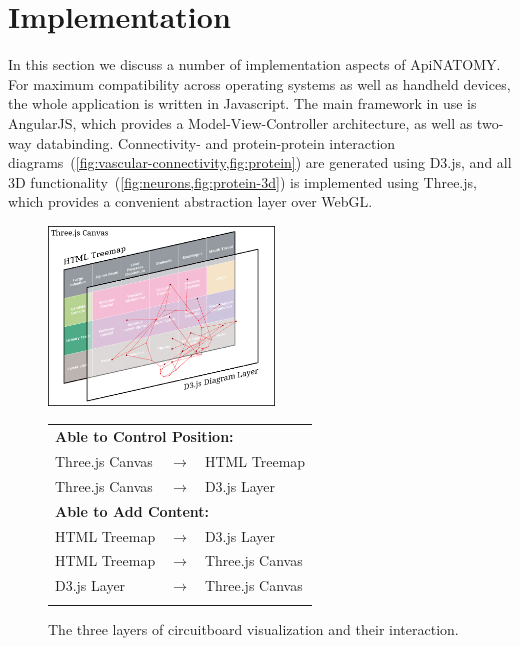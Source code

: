 \section{Implementation} \label{sect:implementation}                                     %

In this section we discuss a number of implementation aspects of \mbox{ApiNATOMY}.
For maximum compatibility across operating systems as well as handheld devices,
the whole application is written in Javascript. The main framework in use is
AngularJS, which provides a Model-View-Controller architecture, as well as
two-way databinding. Connectivity- and protein-protein
interaction diagrams~(\cref{fig:vascular-connectivity,fig:protein})
are generated using D3.js, and all 3D functionality~(\cref{fig:neurons,fig:protein-3d})
is implemented using Three.js, which provides a convenient abstraction layer over WebGL.

\begin{figure}[ht]
	\centering
	\includegraphics[width=6cm]{images/visual-layers.png}
	\hskip1mm
	\begin{tabular}[b]{lcl}
		\multicolumn{3}{l}{\textbf{Able to Control Position:}}     \\[1mm]
		Three.js Canvas     & $\longrightarrow$ & HTML Treemap     \\[1mm]
		Three.js Canvas     & $\longrightarrow$ & D3.js Layer      \\[3mm]
		
		\multicolumn{3}{l}{\textbf{Able to Add Content:}}          \\[1mm]
		HTML Treemap        & $\longrightarrow$ & D3.js Layer      \\[1mm]
		HTML Treemap        & $\longrightarrow$ & Three.js Canvas  \\[1mm]
		D3.js Layer         & $\longrightarrow$ & Three.js Canvas  \\[3mm]\vphantom{x}%
	\end{tabular}
	\vskip1mm
	\caption{The three layers of circuitboard visualization and their interaction.}
	\label{fig:visual-layers}
\end{figure}



